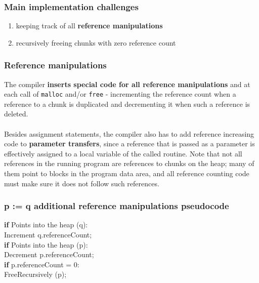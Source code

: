 \documentclass[presentation]{beamer}
\begin{document}
\begin{frame}
  \frametitle{Main implementation challenges}
  \justifying
        \begin{enumerate}
            \item keeping track of all
\textbf{reference manipulations}
            \item  recursively freeing chunks with zero reference count
        \end{enumerate}
\end{frame}

\begin{frame}
    \frametitle{Reference manipulations}
    \justifying
    The compiler \textbf{inserts special code for all reference manipulations} and at each call of \texttt{malloc} and/or \texttt{free} - incrementing
    the reference count when a reference to a chunk is duplicated and decrementing it
    when such a reference is deleted. 
      \\~\\
    Besides assignment statements, the compiler also has to add reference increasing code to \textbf{parameter transfers}, since
    a reference that is passed as a parameter is effectively assigned to a local variable of
    the called routine. Note that not all references in the running program are references to chunks on
    the heap; many of them point to blocks in the program data area, and all reference counting code must make sure it does not follow such references.

  \end{frame}


\begin{frame}
  \frametitle{p := q additional reference manipulations pseudocode}
  \justifying
  \begin{block}{}
  \textbf{if} Points into the heap (q):\\ \hspace*{20pt} Increment q.referenceCount;\\ \textbf{if} Points into the heap (p):\\ \hspace*{20pt} Decrement p.referenceCount;\\ \hspace*{20pt} \textbf{if} p.referenceCount = 0:\\ \hspace*{40pt} FreeRecursively (p);
  \end{block}
\end{frame}  
\end{document}
